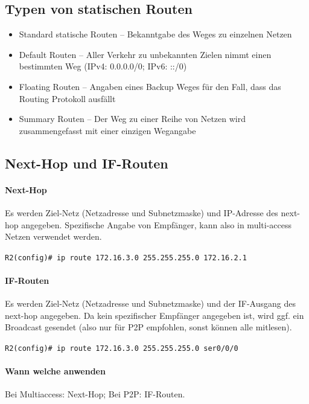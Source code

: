 \documentclass[a4paper,12pt]{article}
\begin{document}
\subsection{Typen von statischen Routen}
\begin{itemize}
\item Standard statische Routen -- Bekanntgabe des Weges zu einzelnen Netzen
\item Default Routen -- Aller Verkehr zu unbekannten Zielen nimmt einen bestimmten Weg (IPv4: 0.0.0.0/0; IPv6: ::/0)
\item Floating Routen -- Angaben eines Backup Weges für den Fall, dass das Routing Protokoll ausfällt
\item Summary Routen -- Der Weg zu einer Reihe von Netzen wird zusammengefasst mit einer einzigen Wegangabe
\end{itemize}

\subsection{Next-Hop und IF-Routen}

\paragraph{Next-Hop}
Es werden Ziel-Netz (Netzadresse und Subnetzmaske) und IP-Adresse des next-hop angegeben. Spezifische Angabe von Empfänger, kann also in multi-access Netzen verwendet werden.

\verb+R2(config)# ip route 172.16.3.0 255.255.255.0 172.16.2.1+
\paragraph{IF-Routen}
Es werden Ziel-Netz (Netzadresse und Subnetzmaske) und der IF-Ausgang des next-hop angegeben. Da kein spezifischer Empfänger angegeben ist, wird ggf. ein Broadcast gesendet (also nur für P2P empfohlen, sonst können alle mitlesen).

\verb+R2(config)# ip route 172.16.3.0 255.255.255.0 ser0/0/0+

\paragraph{Wann welche anwenden}
Bei Multiaccess: Next-Hop; Bei P2P: IF-Routen.
\end{document}
